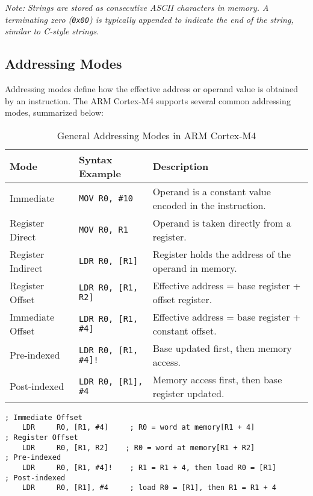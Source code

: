 \noindent\textit{Note: Strings are stored as consecutive ASCII characters in memory. A terminating zero (\texttt{0x00}) is typically appended to indicate the end of the string, similar to C-style strings.}

\subsection{Addressing Modes}

Addressing modes define how the effective address or operand value is obtained by an instruction. 
The ARM Cortex-M4 supports several common addressing modes, summarized below:

\begin{table}[H]
\centering
\caption{General Addressing Modes in ARM Cortex-M4}
\small
\begin{tabularx}{\linewidth}{@{}l l X@{}}
\toprule
\textbf{Mode} & \textbf{Syntax Example} & \textbf{Description} \\
\midrule
Immediate      & \texttt{MOV R0, \#10}          & Operand is a constant value encoded in the instruction. \\
Register Direct& \texttt{MOV R0, R1}            & Operand is taken directly from a register. \\
Register Indirect & \texttt{LDR R0, [R1]}       & Register holds the address of the operand in memory. \\
Register Offset & \texttt{LDR R0, [R1, R2]}     & Effective address = base register + offset register. \\
Immediate Offset & \texttt{LDR R0, [R1, \#4]}   & Effective address = base register + constant offset. \\
Pre-indexed    & \texttt{LDR R0, [R1, \#4]!}    & Base updated first, then memory access. \\
Post-indexed   & \texttt{LDR R0, [R1], \#4}     & Memory access first, then base register updated. \\
\bottomrule
\end{tabularx}
\vspace{2pt}
\end{table}
\begin{lstlisting}[caption={Examples of Offset, Pre-indexed, and Post-indexed Addressing Modes}]
; Immediate Offset
    LDR     R0, [R1, #4]     ; R0 = word at memory[R1 + 4]
; Register Offset
    LDR     R0, [R1, R2]    ; R0 = word at memory[R1 + R2]
; Pre-indexed
    LDR     R0, [R1, #4]!    ; R1 = R1 + 4, then load R0 = [R1]
; Post-indexed
    LDR     R0, [R1], #4     ; load R0 = [R1], then R1 = R1 + 4
\end{lstlisting}

